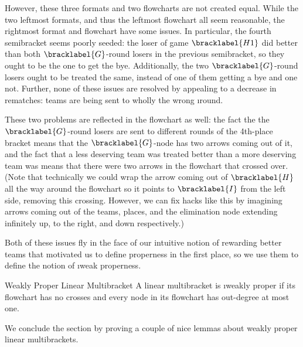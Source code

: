 {    

    However, these three formats and two flowcharts are not created equal. While the two leftmost formats, and thus the leftmost flowchart all seem reasonable, the rightmost format and flowchart have some issues. In particular, the fourth semibracket seems poorly seeded: the loser of game $\bracklabel{H1}$ did better than both $\bracklabel{G}$-round losers in the previous semibracket, so they ought to be the one to get the bye. Additionally, the two $\bracklabel{G}$-round losers ought to be treated the same, instead of one of them getting a bye and one not. Further, none of these issues are resolved by appealing to a decrease in rematches: teams are being sent to wholly the wrong \i{round}.

    These two problems are reflected in the flowchart as well: the fact the the $\bracklabel{G}$-round losers are sent to different rounds of the 4th-place bracket means that the $\bracklabel{G}$-node has two arrows coming out of it, and the fact that a less deserving team was treated better than a more deserving team was means that there were two arrows in the flowchart that crossed over. (Note that technically we could wrap the arrow coming out of $\bracklabel{H}$ all the way around the flowchart so it points to $\bracklabel{I}$ from the left side, removing this crossing. However, we can fix hacks like this by imagining arrows coming out of the teams, places, and the elimination node extending infinitely up, to the right, and down respectively.)

    Both of these issues fly in the face of our intuitive notion of rewarding better teams that motivated us to define properness in the first place, so we use them to define the notion of \i{weak properness}.

    \begin{definition}{Weakly Proper Linear Multibracket}{}
        A linear multibracket is \i{weakly proper} if its flowchart has no crosses and every node in its flowchart has out-degree at most one.
    \end{definition}

    We conclude the section by proving a couple of nice lemmas about weakly proper linear multibrackets.


}
